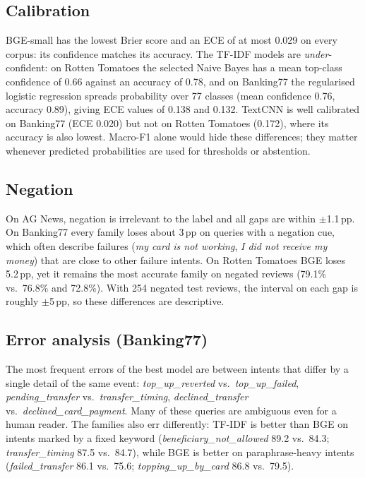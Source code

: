 \subsection{Calibration}
BGE-small has the lowest Brier score and an ECE of at most 0.029 on every corpus: its confidence matches its accuracy. The TF-IDF models are \emph{under}-confident: on Rotten Tomatoes the selected Naive Bayes has a mean top-class confidence of 0.66 against an accuracy of 0.78, and on Banking77 the regularised logistic regression spreads probability over 77 classes (mean confidence 0.76, accuracy 0.89), giving ECE values of 0.138 and 0.132. TextCNN is well calibrated on Banking77 (ECE 0.020) but not on Rotten Tomatoes (0.172), where its accuracy is also lowest. Macro-F1 alone would hide these differences; they matter whenever predicted probabilities are used for thresholds or abstention.

\subsection{Negation}

On AG News, negation is irrelevant to the label and all gaps are within $\pm$1.1\,pp. On Banking77 every family loses about 3\,pp on queries with a negation cue, which often describe failures (\textit{my card is not working}, \textit{I did not receive my money}) that are close to other failure intents. On Rotten Tomatoes BGE loses 5.2\,pp, yet it remains the most accurate family on negated reviews (79.1\% vs.\ 76.8\% and 72.8\%). With 254 negated test reviews, the interval on each gap is roughly $\pm$5\,pp, so these differences are descriptive.

\subsection{Error analysis (Banking77)}




The most frequent errors of the best model are between intents that differ by a single detail of the same event: \textit{top\_up\_reverted} vs.\ \textit{top\_up\_failed}, \textit{pending\_transfer} vs.\ \textit{transfer\_timing}, \textit{declined\_transfer} vs.\ \textit{declined\_card\_payment}. Many of these queries are ambiguous even for a human reader. The families also err differently: TF-IDF is better than BGE on intents marked by a fixed keyword (\textit{beneficiary\_not\_allowed} 89.2 vs.\ 84.3; \textit{transfer\_timing} 87.5 vs.\ 84.7), while BGE is better on paraphrase-heavy intents (\textit{failed\_transfer} 86.1 vs.\ 75.6; \textit{topping\_up\_by\_card} 86.8 vs.\ 79.5).
